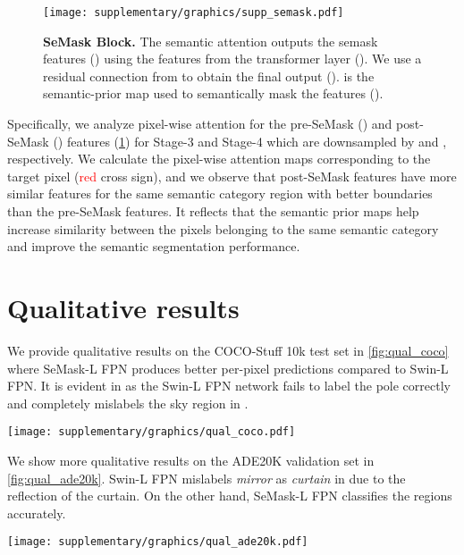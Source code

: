 \documentclass[10pt,twocolumn,letterpaper]{article}
\begin{document}
\begin{figure}[ht!]
\centering
\texttt{[image: supplementary/graphics/supp\_semask.pdf]}
\caption{
  \textbf{SeMask Block.} The semantic attention outputs the semask features () using the features from the transformer layer (). We use a residual connection from  to obtain the final output ().  is the semantic-prior map used to semantically mask the features ().}
  \label{fig:supp_semask}
\end{figure}

Specifically, we analyze pixel-wise attention for the pre-SeMask () and post-SeMask () features (\cref{fig:supp_semask}) for Stage-3 and Stage-4 which are downsampled by  and , respectively. We calculate the pixel-wise attention maps corresponding to the target pixel (\textcolor{red}{red} cross sign), and we observe that post-SeMask features have more similar features for the same semantic category region with better boundaries than the pre-SeMask features. It reflects that the semantic prior maps help increase similarity between the pixels belonging to the same semantic category and improve the semantic segmentation performance. \section{Qualitative results}
\label{sec:qual}

We provide qualitative results on the COCO-Stuff 10k test set in \cref{fig:qual_coco} where SeMask-L FPN produces better per-pixel predictions compared to Swin-L FPN. It is evident in  as the Swin-L FPN network fails to label the pole correctly and completely mislabels the sky region in .

\begin{figure*}
\centering
\texttt{[image: supplementary/graphics/qual\_coco.pdf]}
\caption{
  \textbf{Qualitative results on the COCO-Stuff 10k test set.} Swin-L FPN completely mislabels the sky region and a significant part of the ground in , and our \textbf{SeMask-L FPN} shows better accuracy in classifying the regions.}
  \label{fig:qual_coco}
\end{figure*}

We show more qualitative results on the ADE20K validation set in \cref{fig:qual_ade20k}. Swin-L FPN mislabels \textit{mirror} as \textit{curtain} in  due to the reflection of the curtain. On the other hand, SeMask-L FPN classifies the regions accurately.

\begin{figure*}
\centering
\texttt{[image: supplementary/graphics/qual\_ade20k.pdf]}
\caption{
  \textbf{Qualitative results on the ADE20K validation set.} Our \textbf{SeMask-L FPN} can correctly classify the mirror region in , whereas Swin-L FPN mislabels a significant part of the mirror as curtain owing to the reflection.}
  \label{fig:qual_ade20k}
\end{figure*}


 
\end{document}
